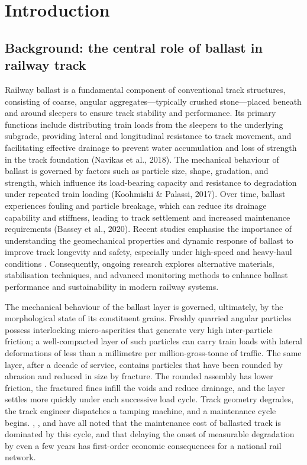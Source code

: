 \chapter{Introduction}
\label{ch:introduction}

\section{Background: the central role of ballast in railway track}
\label{sec:background}

Railway ballast is a fundamental component of conventional track structures, consisting of coarse, angular aggregates---typically crushed stone---placed beneath and around sleepers to ensure track stability and performance. Its primary functions include distributing train loads from the sleepers to the underlying subgrade, providing lateral and longitudinal resistance to track movement, and facilitating effective drainage to prevent water accumulation and loss of strength in the track foundation (Navikas et al., 2018). The mechanical behaviour of ballast is governed by factors such as particle size, shape, gradation, and strength, which influence its load-bearing capacity and resistance to degradation under repeated train loading (Koohmishi \& Palassi, 2017). Over time, ballast experiences fouling and particle breakage, which can reduce its drainage capability and stiffness, leading to track settlement and increased maintenance requirements (Bassey et al., 2020). Recent studies emphasise the importance of understanding the geomechanical properties and dynamic response of ballast to improve track longevity and safety, especially under high-speed and heavy-haul conditions \citep{alabbasi2021}. Consequently, ongoing research explores alternative materials, stabilisation techniques, and advanced monitoring methods to enhance ballast performance and sustainability in modern railway systems.

The mechanical behaviour of the ballast layer is governed, ultimately, by the morphological state of its constituent grains. Freshly quarried angular particles possess interlocking micro-asperities that generate very high inter-particle friction; a well-compacted layer of such particles can carry train loads with lateral deformations of less than a millimetre per million-gross-tonne of traffic. The same layer, after a decade of service, contains particles that have been rounded by abrasion and reduced in size by fracture. The rounded assembly has lower friction, the fractured fines infill the voids and reduce drainage, and the layer settles more quickly under each successive load cycle. Track geometry degrades, the track engineer dispatches a tamping machine, and a maintenance cycle begins. \citet{esveld2001}, \citet{lichtberger2005}, and \citet{indraratna2011} have all noted that the maintenance cost of ballasted track is dominated by this cycle, and that delaying the onset of measurable degradation by even a few years has first-order economic consequences for a national rail network.

